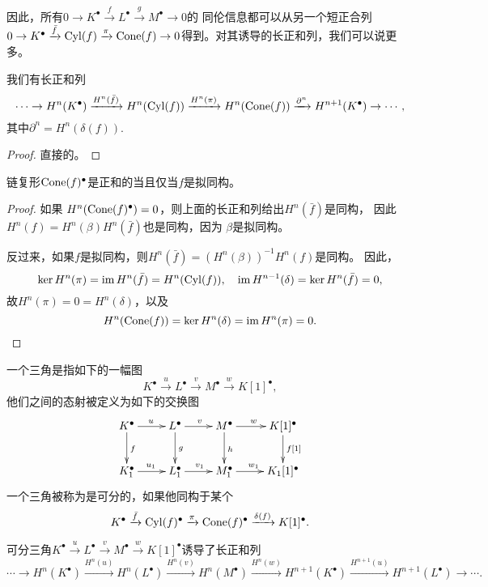 因此，所有$0\to K^\bullet \xrightarrow{f}L^\bullet \xrightarrow{g}M^\bullet\to 0$的
同伦信息都可以从另一个短正合列$0\to K^\bullet \xrightarrow{\bar f}\operatorname{Cyl}(f) \xrightarrow{\pi}\operatorname{Cone}(f)\to 0$得到。对其诱导的长正和列，我们可以说更多。

\begin{lem}\label{lem:1.14}
	我们有长正和列
	\[
		\cdots\to H^n(K^\bullet)\xrightarrow{H^n(\bar f)}H^n(\operatorname{Cyl}(f))\xrightarrow{H^n(\pi)}H^n(\operatorname{Cone}(f))\xrightarrow{\partial^n}H^{n+1}(K^\bullet)\to\cdots,
	\]
	其中$\partial^n=H^n(\delta(f))$.
\end{lem}

\begin{proof}
	直接的。
\end{proof}

\begin{coro}
	链复形$\operatorname{Cone}(f)^\bullet$是正和的当且仅当$f$是拟同构。
\end{coro}

\begin{proof}
	如果 $H^n(\operatorname{Cone}(f)^\bullet)=0$，则上面的长正和列给出$H^n(\bar f)$是同构，
    因此$H^n(f)=H^n(\beta)H^n(\bar f)$也是同构，因为
    $\beta$是拟同构。

	反过来，如果$f$是拟同构，则$H^n(\bar f)=(H^n(\beta))^{-1}H^n(f)$是同构。
    因此，
	\[
		\ker H^n(\pi)=\operatorname{im} H^n(\bar f)=H^n(\operatorname{Cyl}(f)),\quad 
		\operatorname{im} H^{n-1}(\delta)=\ker H^n(\bar f)=0,
	\]
	故$H^n(\pi)=0=H^{n}(\delta)$，以及 
	\[
		H^n(\operatorname{Cone}(f))=\ker H^n(\delta)=\operatorname{im} H^n(\pi)=0.\qedhere
	\]
\end{proof}

\begin{para}[三角]
	一个三角是指如下的一幅图
	\[
		K^\bullet \xrightarrow{u}L^\bullet\xrightarrow{v}M^\bullet 
		\xrightarrow{w}K[1]^\bullet,
	\]
	他们之间的态射被定义为如下的交换图
	\[
		\xymatrix{
		K^\bullet \ar@{->}[r]^{u} \ar@{->}[d]^{f} & L^\bullet \ar@{->}[r]^{v} \ar@{->}[d]^{g} & M^\bullet \ar@{->}[r]^{w} \ar@{->}[d]^{h} & K[1]^\bullet \ar@{->}[d]^{{f[1]}} \\
		K_1^\bullet \ar@{->}[r]^{u_1} & L_1^\bullet \ar@{->}[r]^{v_1} & M_1^\bullet \ar@{->}[r]^{w_1} & K_1[1]^\bullet
		}
	\]
	一个三角被称为是可分的，如果他同构于某个
	\[
		K^\bullet \xrightarrow{\bar f}\operatorname{Cyl}(f)^\bullet \xrightarrow{\pi}\operatorname{Cone}(f)^\bullet\xrightarrow{\delta(f)}K[1]^\bullet.
	\]
\end{para}

\begin{pro}
	可分三角$K^\bullet \xrightarrow{u}L^\bullet\xrightarrow{v}M^\bullet 
	\xrightarrow{w}K[1]^\bullet$诱导了长正和列
    \[
		\cdots\to H^n(K^\bullet)\xrightarrow{H^n(u)}H^n(L^\bullet)\xrightarrow{H^n(v)}H^n(M^\bullet)\xrightarrow{H^n(w)}H^{n+1}(K^\bullet)\xrightarrow{H^{n+1}(u)}H^{n+1}(L^\bullet)\to\cdots.
	\]
\end{pro}

